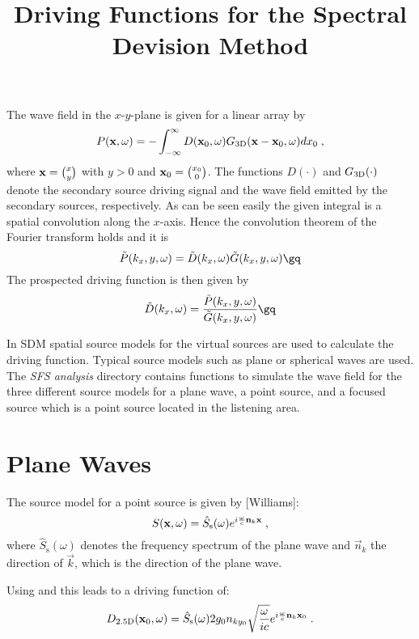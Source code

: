 \documentclass{article}
\title{Driving Functions for the Spectral Devision Method}
\begin{document}
\maketitle

The wave field in the $x$-$y$-plane is given for a linear array by
\begin{equation}
    P( \mathbf{x} ,\omega) = - \int^{\infty}_{-\infty} D( \mathbf{x} _0,\omega)
    G_{\text{3D}}(  \mathbf{x} - \mathbf{x} _0 ,\omega) dx_0
    \;,
    \label{eq:P}
\end{equation}
where $ \mathbf{x}  = \binom{x}{y}$ with $y>0$ and $ \mathbf{x} _0 = \binom{x_0}{0}$. The
functions $D(\cdot)$ and $G_{\text{3D}}(\cdot)$ denote the
secondary source driving signal and the wave field emitted by the secondary
sources, respectively.
As can be seen easily the given integral is a spatial convolution along the
$x$-axis.
Hence the convolution theorem of the Fourier transform holds and it is
\begin{equation}
    \tilde{P}(k_x,y,\omega) = \tilde{D}(k_x,\omega) \tilde{G}(k_x,y,\omega)
    \gq
\end{equation}
The prospected driving function is then given by
\begin{equation}
    \tilde{D}(k_x,\omega) =
    \frac{\tilde{P}(k_x,y,\omega)}{\tilde{G}(k_x,y,\omega)}
    \gq
\end{equation}

In SDM spatial
source models for the virtual sources are used to calculate the driving
function. Typical source models such as plane or spherical waves are used. The 
\textit{SFS analysis} directory contains functions to simulate the wave field
for the three different source models for a plane wave, a point source, and a
focused source which is a point source located in the listening area.


\section{Plane Waves}
The source model for a point source is given by [Williams]:
\begin{equation} 
    S( \mathbf{x} ,\omega) = 
    \hat{S}_\text{s}(\omega)
    e^{i \frac{\omega}{c}   \mathbf{n} _k  \mathbf{x} }
    \;,
\end{equation}
where $\hat{S}_\text{s}(\omega)$ denotes the frequency spectrum of the plane
wave and $\vec{n}_k$ the direction of $\vec{k}$, which is the direction of the
plane wave.

Using  and  this leads to a driving function of:
\begin{equation}
    D_{\text{2.5D}}( \mathbf{x} _0,\omega) = \hat{S}_\text{s}(\omega)
    2 g_0 n_{ky_0} \sqrt{\frac{\omega}{ic}}
    e^{i \frac{\omega}{c}   \mathbf{n} _k  \mathbf{x} _0}
    \;.
    \label{Dpw}
\end{equation}
\end{document}

